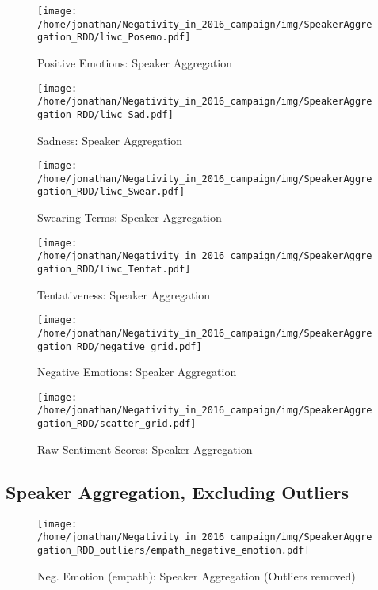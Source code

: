 \begin{figure}[h]\centering
	\texttt{[image: /home/jonathan/Negativity\_in\_2016\_campaign/img/SpeakerAggregation\_RDD/liwc\_Posemo.pdf]}
	\caption{Positive Emotions: Speaker Aggregation}
	\label{fig: sa_Positive Emotions}
\end{figure}

\begin{figure}[h]\centering
	\texttt{[image: /home/jonathan/Negativity\_in\_2016\_campaign/img/SpeakerAggregation\_RDD/liwc\_Sad.pdf]}
	\caption{Sadness: Speaker Aggregation}
	\label{fig: sa_Sadness}
\end{figure}

\begin{figure}[h]\centering
	\texttt{[image: /home/jonathan/Negativity\_in\_2016\_campaign/img/SpeakerAggregation\_RDD/liwc\_Swear.pdf]}
	\caption{Swearing Terms: Speaker Aggregation}
	\label{fig: sa_Swearing Terms}
\end{figure}

\begin{figure}[h]\centering
	\texttt{[image: /home/jonathan/Negativity\_in\_2016\_campaign/img/SpeakerAggregation\_RDD/liwc\_Tentat.pdf]}
	\caption{Tentativeness: Speaker Aggregation}
	\label{fig: sa_Tentativeness}
\end{figure}

\begin{figure}[h]\centering
	\texttt{[image: /home/jonathan/Negativity\_in\_2016\_campaign/img/SpeakerAggregation\_RDD/negative\_grid.pdf]}
	\caption{Negative Emotions: Speaker Aggregation}
	\label{fig: sa_Negative Emotions}
\end{figure}

\begin{figure}[h]\centering
	\texttt{[image: /home/jonathan/Negativity\_in\_2016\_campaign/img/SpeakerAggregation\_RDD/scatter\_grid.pdf]}
	\caption{Raw Sentiment Scores: Speaker Aggregation}
	\label{fig: sa_Raw Sentiment Scores}
\end{figure}

\clearpage
\pagebreak

\subsection{Speaker Aggregation, Excluding Outliers}

\begin{figure}[h]\centering
	\texttt{[image: /home/jonathan/Negativity\_in\_2016\_campaign/img/SpeakerAggregation\_RDD\_outliers/empath\_negative\_emotion.pdf]}
	\caption{Neg. Emotion (empath): Speaker Aggregation (Outliers removed)}
	\label{fig: sa_Neg. Emotion (empath)}
\end{figure}

